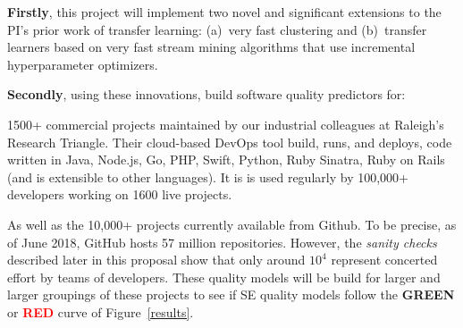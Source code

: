 
{\bf Firstly},
 this project will implement
 two novel and significant extensions
 to the PI's prior work of transfer learning: (a)~very fast clustering and (b)~transfer
learners based 
on  
very fast stream mining  algorithms that use
incremental hyperparameter optimizers.

   
{\bf Secondly}, using these innovations,   build software quality predictors for:
\bi 
\item
1500+ 
commercial projects maintained by our industrial colleagues at Raleigh's Research Triangle.
Their cloud-based  DevOps tool    build, runs, and deploys, code written in   Java, Node.js,  Go, PHP,  Swift,  Python,  Ruby  Sinatra,  Ruby  on Rails (and  is extensible to  other languages).   It is  is used regularly by   100,000+  developers working on   1600 live projects.
\item
As well as the 10,000+  projects currently available from Github. To be precise,
as of June 2018, GitHub  hosts  57 million repositories. However,  the {\em sanity checks} described later in this proposal show that only around $10^4$ represent concerted  effort by teams of developers.
\ei
These quality models will be build for larger and larger groupings of these projects    to see if  SE
quality models follow the \textcolor{ao(english)}{{\bf GREEN}} or  \textcolor{red}{{\bf RED}} curve of Figure~\ref{results}.



